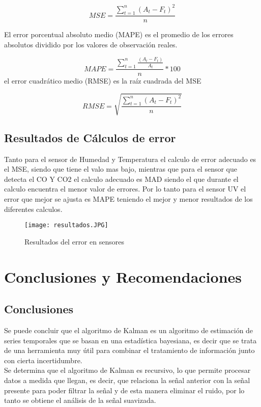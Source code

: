 \documentclass[10pt,a4paper]{article}
\begin{document}
\begin{equation}
MSE= \frac{\sum_{t=1}^{n}(A_{t}-F_{t})^{2}}{n}
\end{equation}

El error porcentual absoluto medio (MAPE) es el promedio de los errores absolutos dividido por los valores de observación reales.

\begin{equation}
MAPE= \frac{\sum_{t=1}^{n}\frac{(A_{t}-F_{t})}{A_{t}}}{n}*100
\end{equation}
el error cuadrático medio (RMSE) es la raíz cuadrada del MSE

\begin{equation}
RMSE= \sqrt{\frac{\sum_{t=1}^{n}(A_{t}-F_{t})^{2}}{n}}
\end{equation}

\subsection{Resultados de Cálculos de error}


Tanto para el sensor de Humedad y Temperatura el calculo de error adecuado es el MSE, siendo que tiene el valo mas bajo, mientras que para el sensor que detecta el CO Y CO2 el calculo adecuado es MAD siendo el que durante el calculo encuentra el menor valor de errores. Por lo tanto para el sensor UV el error que mejor se ajusta es MAPE teniendo el mejor y menor resultados de los diferentes calculos.

\begin{figure}[H]
\centering
\texttt{[image: resultados.JPG]}
 \caption{Resultados del error en sensores} 
\end{figure} 


\section{Conclusiones y Recomendaciones}
\subsection{Conclusiones}

Se puede concluir que el algoritmo de Kalman es un algoritmo de estimación de series temporales que se basan en una estadística bayesiana, es decir que se trata de una herramienta muy útil para combinar el tratamiento de información junto con cierta incertidumbre.\\

Se determina que el algoritmo de Kalman es recursivo, lo que permite procesar datos a medida que llegan, es decir, que relaciona la señal anterior con la señal presente para poder filtrar la señal y de esta manera eliminar el ruido, por lo tanto se obtiene el análisis de la señal suavizada. \\
\end{document}
